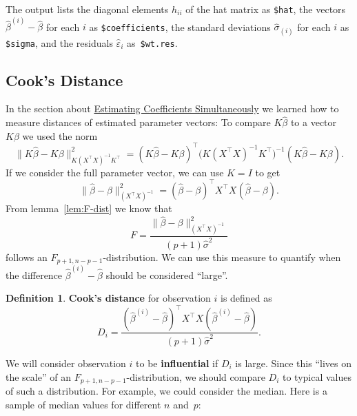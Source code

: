 \documentclass[
  a4paper,
]{article}
\theoremstyle{definition}
\newtheorem{definition}{Definition}[section]
\theoremstyle{definition}
\theoremstyle{definition}
\theoremstyle{definition}
\theoremstyle{remark}
\begin{document}
The output lists the diagonal elements \(h_{ii}\) of the hat matrix
as \texttt{\$hat}, the vectors \(\hat\beta^{(i)} - \hat\beta\) for each \(i\)
as \texttt{\$coefficients}, the standard deviations \(\hat\sigma_{(i)}\)
for each \(i\) as \texttt{\$sigma}, and the residuals \(\hat\varepsilon_i\) as~\texttt{\$wt.res}.

\subsection{Cook's Distance}\label{influence}

In the section about \hyperref[S06-simultaneous]{Estimating Coefficients Simultaneously} we learned
how to measure distances of estimated parameter vectors: To compare
\(K\hat\beta\) to a vector \(K\beta\) we used the norm
\begin{equation*}
  \bigl\| K\hat\beta - K\beta \bigr\|_{K(X^\top X)^{-1}K^\top}^2
  = (K\hat\beta - K\beta)^\top \bigl(K(X^\top X)^{-1}K^\top\bigr)^{-1} (K\hat\beta - K\beta).
\end{equation*}
If we consider the full parameter vector, we can use \(K = I\) to get
\begin{equation*}
  \bigl\| \hat\beta - \beta \bigr\|_{(X^\top X)^{-1}}^2
  = (\hat\beta - \beta)^\top X^\top X (\hat\beta - \beta).
\end{equation*}
From lemma~\ref{lem:F-dist} we know that
\begin{equation*}
  F = \frac{\bigl\| \hat\beta - \beta \bigr\|_{(X^\top X)^{-1}}^2}{(p+1)\hat\sigma^2}
\end{equation*}
follows an \(F_{p+1, n-p-1}\)-distribution. We can use this measure to
quantify when the difference \(\hat\beta^{(i)} - \hat\beta\) should be
considered ``large''.

\begin{definition}
\protect\hypertarget{def:Cook-D}{}\label{def:Cook-D}\textbf{Cook's distance} for observation \(i\) is defined as
\begin{equation*}
  D_i
  = \frac{(\hat\beta^{(i)} - \hat\beta)^\top X^\top X (\hat\beta^{(i)} - \hat\beta)}{(p+1)\hat\sigma^2}.
\end{equation*}
\end{definition}

We will consider observation \(i\) to be \textbf{influential} if \(D_i\) is large.
Since this ``lives on the scale'' of an \(F_{p+1, n-p-1}\)-distribution,
we should compare \(D_i\) to typical values of such a distribution. For
example, we could consider the median. Here is a sample of median values
for different \(n\) and~\(p\):
\end{document}
